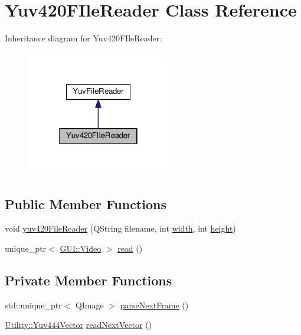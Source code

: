 \hypertarget{classUtility_1_1Yuv420FIleReader}{}\section{Yuv420\+F\+Ile\+Reader Class Reference}
\label{classUtility_1_1Yuv420FIleReader}


Inheritance diagram for Yuv420\+F\+Ile\+Reader\+:
\nopagebreak
\begin{figure}[H]
\begin{center}
\leavevmode
\includegraphics[width=178pt]{classUtility_1_1Yuv420FIleReader__inherit__graph}
\end{center}
\end{figure}
\subsection*{Public Member Functions}
\begin{DoxyCompactItemize}
\item 
void \hyperlink{classUtility_1_1Yuv420FIleReader_a16100d125e29dc91641cd6044bc57be4}{yuv420\+File\+Reader} (Q\+String filename, int \hyperlink{classUtility_1_1YuvFileReader_a2474a5474cbff19523a51eb1de01cda4}{width}, int \hyperlink{classUtility_1_1YuvFileReader_ad12fc34ce789bce6c8a05d8a17138534}{height})
\item 
unique\+\_\+ptr$<$ \hyperlink{classGUI_1_1Video}{G\+U\+I\+::\+Video} $>$ \hyperlink{classUtility_1_1Yuv420FIleReader_ac6e45d1a396bdb81c8c8174bf5cc41c6}{read} ()
\end{DoxyCompactItemize}
\subsection*{Private Member Functions}
\begin{DoxyCompactItemize}
\item 
std\+::unique\+\_\+ptr$<$ Q\+Image $>$ \hyperlink{classUtility_1_1Yuv420FIleReader_a9199e88b4e515fc6d1661cea467466c5}{parse\+Next\+Frame} ()
\item 
\hyperlink{classUtility_1_1Yuv444Vector}{Utility\+::\+Yuv444\+Vector} \hyperlink{classUtility_1_1Yuv420FIleReader_a51664e2c9d28f58d019be8d15392cd1d}{read\+Next\+Vector} ()
\end{DoxyCompactItemize}
